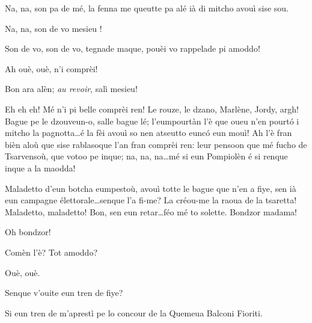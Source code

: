 \begin{drama}
\Pompiolenspeaks Na, na, son pa de mé, la fenna me queutte pa alé ià di mitcho avouì sise sou.

\Dallasspeaks Na, na, son de vo mesieu \ok !


\Dallasspeaks Son de vo, son de vo, tegnade maque, pouèi vo rappelade pi amoddo!

\Pompiolenspeaks {} Ah ouè, ouè, n'i comprèi!

\Joellespeaks Bon ara alèn; \textit{au revoir}, salì mesieu!


\Pompiolenspeaks {} Eh eh eh!  Mé n'i pi belle comprèi ren! Le rouze, le dzano, Marlène, Jordy, argh! Bague pe le dzouveun-o, salle bague lé; l'eumpourtàn l'è que oueu n'en pourt\'o i mitcho la pagnotta\ldots é la fèi avouì so  nen atseutto eunc\'o eun mouì! Ah l'è fran bièn aloù que sise rablasoque l'an fran comprèi ren: leur pensoon que mé fucho de Tsarvensoù, que votoo pe inque; na, na, na\ldots mé si eun Pompiolèn é si renque inque a la maodda!





\Cimaspeaks Maladetto d'eun botcha eumpestoù, avouì totte le bague que n'en a fiye, sen ià eun campagne élettorale\ldots senque l'a fi-me? La créou-me la raoua de la tsaretta! Maladetto, maladetto! Bon, sen eun retar\ldots féo mé to solette.  Bondzor madama!

\Saventaspeaks Oh bondzor!

\Cimaspeaks Comèn l'è? Tot amoddo?

\Saventaspeaks Ouè, ouè.

\Cimaspeaks Senque v'ouite eun tren de fiye?

\Saventaspeaks Si eun tren de m'aprestì pe lo concour de la Quemeua Balconi Fioriti.


\end{drama}
